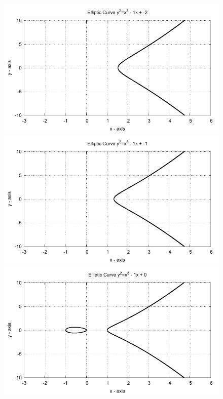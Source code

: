 \begin{figure}[!htbp]

  \begin{minipage}{0.3\textwidth} \centering
    \includegraphics{../Images/ecc_plot/10}
  \end{minipage}
  \begin{minipage}{0.3\textwidth} \centering
    \includegraphics{../Images/ecc_plot/11}
  \end{minipage}
  \begin{minipage}{0.3\textwidth} \centering
    \includegraphics{../Images/ecc_plot/12}
  \end{minipage}
\end{figure}

